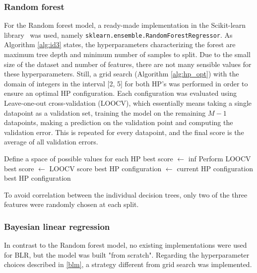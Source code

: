 \documentclass[english, 12pt, a4paper, sci, utf8, a-2b, online]{aaltothesis}
\begin{document}
\subsubsection{Random forest}

For the Random forest model, a ready-made implementation in the Scikit-learn library~\cite{sklearn} was used, namely \verb|sklearn.ensemble.RandomForestRegressor|. As Algorithm \ref{alg:id3} states,
the hyperparameters characterizing the forest are maximum tree depth and minimum number of samples to split. Due to the small size of the dataset and number of features, there are not many sensible
values for these hyperparameters. Still, a grid search (Algorithm \ref{alg:hp_opt}) with the domain of integers in the interval [2, 5] for both HP's was performed in order to ensure an optimal HP
configuration. Each configuration was evaluated using Leave-one-out cross-validation (LOOCV), which essentially means taking a single datapoint as a validation set, training the model
on the remaining $M-1$ datapoints, making a prediction on the validation point and computing the validation error. This is repeated for every datapoint, and the final score is the average of all
validation errors.
%
\begin{algorithm}
  \caption{Grid search for hyperparameter optimization}\label{alg:hp_opt}
  \begin{algorithmic}[1]
    \State Define a space of possible values for each HP
    \State best score $\gets$ inf
    \State Perform LOOCV
    \State best score $\gets$ LOOCV score
    \State best HP configuration $\gets$ current HP configuration
    \EndIf
    \EndFor
    \State \Return best HP configuration
  \end{algorithmic}
\end{algorithm}
%
To avoid correlation between the individual decision trees, only two of the three features were randomly chosen at each split.

\subsubsection{Bayesian linear regression} \label{blm_impl}

In contrast to the Random forest model, no existing implementations were used for BLR, but the model was built "from scratch". Regarding the hyperparameter choices described in \ref{blm}, a
strategy different from grid search was implemented.
\end{document}
